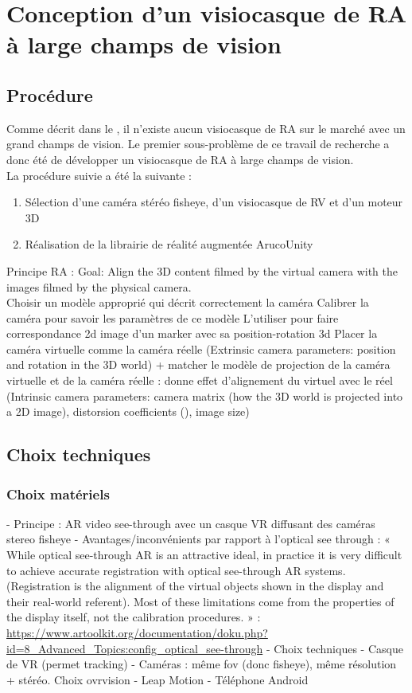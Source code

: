 \chapter{Conception d'un visiocasque de RA à large champs de vision}
\label{ch:methodology}

\section{Procédure}
Comme décrit dans le , il n'existe aucun visiocasque de RA sur le marché avec un grand champs de vision. Le premier sous-problème de ce travail de recherche a donc été de développer un visiocasque de RA à large champs de vision.\\
La procédure suivie a été la suivante :
\begin{enumerate}
  \item Sélection d'une caméra stéréo fisheye, d'un visiocasque de RV et d'un moteur 3D
  \item Réalisation de la librairie de réalité augmentée ArucoUnity
\end{enumerate}

Principe RA :
Goal: Align the 3D content filmed by the virtual camera with the images filmed by the physical camera.\\
Choisir un modèle approprié qui décrit correctement la caméra
Calibrer la caméra pour savoir les paramètres de ce modèle
L'utiliser pour faire correspondance 2d image d'un marker avec sa position-rotation 3d
Placer la caméra virtuelle comme la caméra réelle (Extrinsic camera parameters: position and rotation in the 3D world) + matcher le modèle de projection de la caméra virtuelle et de la caméra réelle : donne effet d'alignement du virtuel avec le réel (Intrinsic camera parameters: camera matrix (how the 3D world is projected into a 2D image), distorsion coefficients (), image size)


\section{Choix techniques}
\label{sec:technical_choices}

\subsection{Choix matériels}
- Principe : AR video see-through avec un casque VR diffusant des caméras stereo fisheye
  - Avantages/inconvénients par rapport à l'optical see through : « While optical see-through AR is an attractive ideal, in practice it is very difficult to achieve accurate registration with optical see-through AR systems. (Registration is the alignment of the virtual objects shown in the display and their real-world referent). Most of these limitations come from the properties of the display itself, not the calibration procedures. » : \url{https://www.artoolkit.org/documentation/doku.php?id=8_Advanced_Topics:config_optical_see-through}
- Choix techniques
  - Casque de VR (permet tracking)
  - Caméras : même fov (donc fisheye), même résolution + stéréo. Choix ovrvision
  - Leap Motion
  - Téléphone Android

